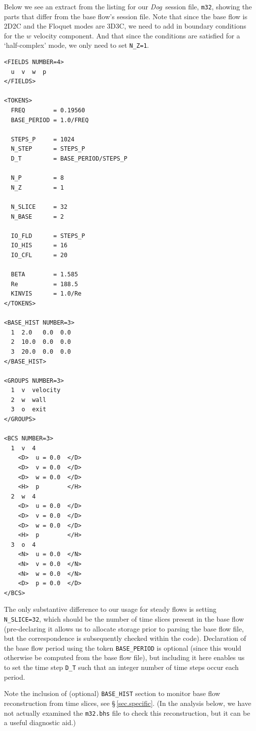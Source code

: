 \documentclass[11pt,a4paper]{report}
\newcommand{\Dog}{\emph{Dog}}
\begin{document}
Below we see an extract from the listing for our \Dog\ session file,
\verb+m32+, showing the parts that differ from the base flow's session
file.  Note that since the base flow is 2D2C and the Floquet modes are
3D3C, we need to add in boundary conditions for the $w$ velocity
component. And that since the conditions are satisfied for a
`half-complex' mode, we only need to set \verb+N_Z=1+.

{\small
\begin{verbatim}
<FIELDS NUMBER=4>
  u  v  w  p
</FIELDS>

<TOKENS>
  FREQ        = 0.19560
  BASE_PERIOD = 1.0/FREQ

  STEPS_P     = 1024
  N_STEP      = STEPS_P
  D_T         = BASE_PERIOD/STEPS_P

  N_P         = 8
  N_Z         = 1

  N_SLICE     = 32
  N_BASE      = 2

  IO_FLD      = STEPS_P
  IO_HIS      = 16
  IO_CFL      = 20

  BETA        = 1.585
  Re          = 188.5
  KINVIS      = 1.0/Re
</TOKENS>

<BASE_HIST NUMBER=3>
  1  2.0   0.0  0.0
  2  10.0  0.0  0.0
  3  20.0  0.0  0.0
</BASE_HIST>

<GROUPS NUMBER=3>
  1  v  velocity
  2  w  wall
  3  o  exit
</GROUPS>

<BCS NUMBER=3>
  1  v  4
    <D>  u = 0.0  </D>
    <D>  v = 0.0  </D>
    <D>  w = 0.0  </D>
    <H>  p        </H>
  2  w  4
    <D>  u = 0.0  </D>
    <D>  v = 0.0  </D>
    <D>  w = 0.0  </D>
    <H>  p        </H>
  3  o  4
    <N>  u = 0.0  </N>
    <N>  v = 0.0  </N>
    <N>  w = 0.0  </N>
    <D>  p = 0.0  </D>
</BCS>
\end{verbatim}
}
\noindent
The only substantive difference to our usage for steady flows is
setting \verb+N_SLICE=32+, which should be the number of time slices
present in the base flow (pre-declaring it allows us to allocate
storage prior to parsing the base flow file, but the correspondence is
subsequently checked within the code). Declaration of the base flow
period using the token \verb+BASE_PERIOD+ is optional (since this
would otherwise be computed from the base flow file), but including it
here enables us to set the time step \verb+D_T+ such that an integer
number of time steps occur each period.

Note the inclusion of (optional) \texttt{BASE\_HIST} section to
monitor base flow reconstruction from time slices, see
\S\,\ref{sec.specific}.  (In the analysis below, we have not
actually examined the \verb+m32.bhs+ file to check this
reconstruction, but it can be a useful diagnostic aid.)
\end{document}
